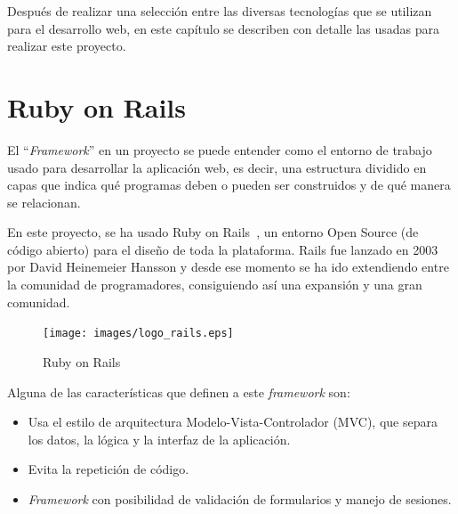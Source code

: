 
Después de realizar una selección entre las diversas tecnologías que se utilizan para el desarrollo web, en este capítulo se describen con detalle las usadas para realizar este proyecto.


\section{Ruby on Rails}
\label{3:sec:1}

El ``\textit{Framework}'' en un proyecto se puede entender como el entorno de trabajo usado para desarrollar la aplicación web, es decir, una estructura dividido en capas que indica qué programas deben o pueden ser construidos y de qué manera se relacionan.

En este proyecto, se ha usado Ruby on Rails~\cite{Rails}, un entorno Open Source (de código abierto) para el diseño de toda la plataforma. Rails fue lanzado en 2003 por David Heinemeier Hansson y desde ese momento se ha ido extendiendo entre la comunidad de programadores, consiguiendo así una expansión y una gran comunidad.

\begin{figure}[!th]
\begin{center}
\texttt{[image: images/logo\_rails.eps]}
\caption{Ruby on Rails}
\label{fig:4}
\end{center}
\end{figure}

Alguna de las características que definen a este \textit{framework} son:

\begin{itemize}
    \item Usa el estilo de arquitectura Modelo-Vista-Controlador (MVC), que separa los datos, la lógica y la interfaz de la aplicación.
    \item Evita la repetición de código.
    \item \textit{Framework} con posibilidad de validación de formularios y manejo de sesiones.
\end{itemize}


